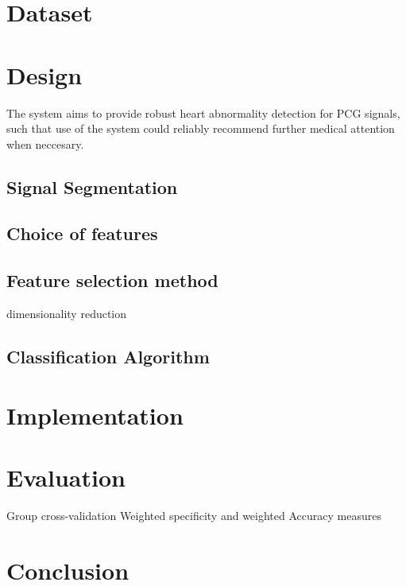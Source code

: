 \documentclass[titlepage, 12pt]{scrartcl} \usepackage{enumitem}
\begin{document}
\section{Dataset}

\section{Design}
The system aims to provide robust heart abnormality detection for PCG signals,
such that use of the system could reliably recommend further medical attention
when neccesary. 
\subsection{Signal Segmentation}
\subsection{Choice of features}
\subsection{Feature selection method}
dimensionality reduction
\subsection{Classification Algorithm}

\section{Implementation}
\section{Evaluation}
Group cross-validation
Weighted specificity and weighted Accuracy measures
\section{Conclusion}



\pagebreak{}
\printbibliography{}
\end{document}
